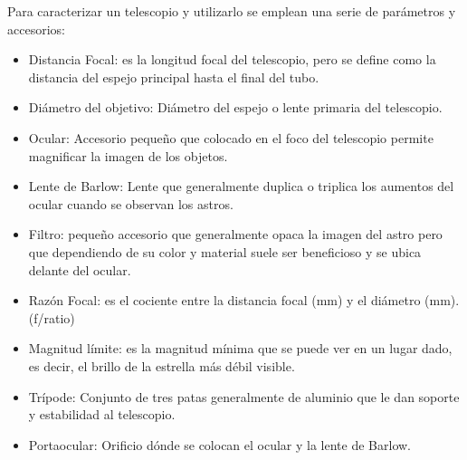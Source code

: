 \documentclass[letterpaper,titlepage,spanish,10pt]{article}
\begin{document}
Para caracterizar un telescopio y utilizarlo se emplean una serie de par\'ametros y accesorios:
\begin{itemize}
    \item Distancia Focal: es la longitud focal del telescopio, pero se define como la distancia del espejo principal hasta el final del tubo.
    \item Di\'ametro del objetivo: Di\'ametro del espejo o lente primaria del telescopio.
    \item Ocular: Accesorio peque\~no que colocado en el foco del telescopio permite magnificar la imagen de los objetos.
    \item Lente de Barlow: Lente que generalmente duplica o triplica los aumentos del ocular cuando se observan los astros.
    \item Filtro: peque\~no accesorio que generalmente opaca la imagen del astro pero que dependiendo de su color y material suele ser beneficioso y se ubica delante del ocular.
    \item Raz\'on Focal: es el cociente entre la distancia focal (mm) y el di\'ametro (mm). (f/ratio)
    \item Magnitud l\'imite: es la magnitud m\'inima que se puede ver en un lugar dado, es decir, el brillo de la estrella m\'as d\'ebil visible.
    \item Tr\'ipode: Conjunto de tres patas generalmente de aluminio que le dan soporte y estabilidad al telescopio.
    \item Portaocular: Orificio d\'onde se colocan el ocular y la lente de Barlow.
\end{itemize}
\end{document}
